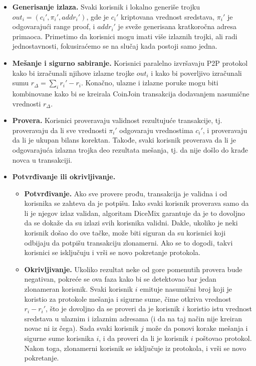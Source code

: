 \documentclass[a4paper]{article}
\begin{document}
\begin{itemize}
	\item \textbf{Generisanje izlaza.} Svaki korisnik i lokalno generiše trojku $out_i = (c_i', \pi_i', addr_i')$, gde je $c_i'$ kriptovana vrednost sredstava, $\pi_i'$ je odgovarajući range proof, i $addr_i'$ je sveže generisana kratkoročna adresa primaoca. Primetimo da korisnici mogu imati više izlaznih trojki, ali radi jednostavnosti, fokusiraćemo se na slučaj kada postoji samo jedna.
	\item \textbf{Mešanje i sigurno sabiranje.} Korisnici paralelno izvršavaju P2P protokol kako bi izračunali njihove izlazne trojke $out_i$ i kako bi poverljivo izračunali sumu $r_\Delta = \sum_{i} r_i' - r_i$. Konačno, ulazne i izlazne poruke mogu biti kombinovane kako bi se kreirala CoinJoin transakcija dodavanjem nasumične vrednosti $r_\Delta$.
	\item \textbf{Provera.} Korisnici proveravaju validnost rezultujuće transakcije, tj. proveravaju da li sve vrednosti $\pi_i'$ odgovaraju vrednostima $c_i'$, i proveravaju da li je ukupan bilans korektan. Takođe, svaki korisnik proverava da li je odgovarajuća izlazna trojka deo rezultata mešanja, tj. da nije došlo do krađe novca u transakciji.
	\item \textbf{Potvrđivanje ili okrivljivanje.}
		\begin{itemize}
			\item \textbf{Potvrđivanje.} Ako sve provere prođu, transakcija je validna i od korisnika se zahteva da je potpišu. Iako svaki korisnik proverava samo da li je njegov izlaz validan, algoritam DiceMix garantuje da je to dovoljno da se dokaže da su izlazi svih korisnika validni. Dakle, ukoliko je neki korisnik došao do ove tačke, može biti siguran da su korisnici koji odbijaju da potpišu transakciju zlonamerni. Ako se to dogodi, takvi korisnici se isključuju i vrši se novo pokretanje protokola.
			\item \textbf{Okrivljivanje.} Ukoliko rezultat neke od gore pomenutih provera bude negativan, pokreće se ova faza kako bi se detektovao bar jedan zlonameran korisnik. Svaki korisnik $i$ emituje nasumični broj koji je koristio za protokole mešanja i sigurne sume, čime otkriva vrednost $r_i - r_i'$, što je dovoljno da se proveri da je korisnik $i$ koristio istu vrednost sredstava u ulaznim i izlaznim adresama (i da na taj način nije kreiran novac ni iz čega). Sada svaki korisnik $j$ može da ponovi korake mešanja i sigurne sume korisnika $i$, i da proveri da li je korisnik $i$ poštovao protokol. Nakon toga, zlonamerni korisnik se isključuje iz protokola, i vrši se novo pokretanje. 
		\end{itemize}	
\end{itemize}
\end{document}
